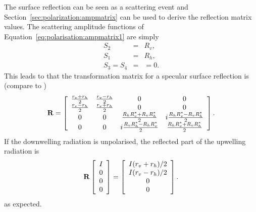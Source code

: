 The surface reflection can be seen as a scattering event and
Section~\ref{sec:polarization:ampmatrix} can be used to derive the
reflection matrix values. The scattering amplitude functions of
Equation~\ref{eq:polarisation:ampmatrix1} are simply
\begin{eqnarray}
  S_2 &=& R_v, \\
  S_1 &=& R_h, \\
  S_3 = S_4 &=& =0.
\end{eqnarray}
This leads to that the transformation matrix for a specular surface
reflection is (compare to \citet[Sec.\ 5.4.3]{liou:02})
\begin{equation}
  \label{eq:surface:specular_matrix}
  \mathbf{R} =
     \left[\begin{array}{cccc}
       \frac{r_v+r_h}{2}&\frac{r_v-r_h}{2}&0&0\\
       \frac{r_v-r_h}{2}&\frac{r_v+r_h}{2}&0&0\\
    0&0&\frac{R_hR_v^\ast+R_vR_h^\ast}{2}&i\frac{R_hR_v^\ast-R_vR_h^\ast}{2}\\
    0&0&i\frac{R_vR_h^\ast-R_hR_v^\ast}{2}&\frac{R_hR_v^\ast+R_vR_h^\ast}{2}\\
     \end{array}
     \right].
\end{equation}
If the downwelling radiation is unpolarised, the reflected part of the
upwelling radiation is
\begin{equation}
  \mathbf{R}
  \left[ \begin{array}{c} I\\0\\0\\0 \end{array} \right] =
  \left[ \begin{array}{c} I(r_v+r_h)/2\\I(r_v-r_h)/2\\0\\0 
  \end{array} \right].
\end{equation}
as expected.


